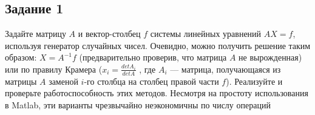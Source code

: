 \documentclass[11pt]{article}
\begin{document}
    \hypertarget{ux437ux430ux434ux430ux43dux438ux435-1}{%
\subsection{Задание 1}\label{ux437ux430ux434ux430ux43dux438ux435-1}}

Задайте матрицу \(A\) и вектор-столбец \(f\) системы линейных уравнений
\(AX = f\), используя генератор случайных чисел. Очевидно, можно
получить решение таким образом: \(X = A^{−1} f\) (предварительно
проверив, что матрица \(A\) не вырожденная) или по правилу Крамера
(\(x_{i} = \frac{det A_{i}}{det A}\) , где \(A_{i}\) --- матрица,
получающаяся из матрицы \(A\) заменой \(i\)-го столбца на столбец правой
части \(f\)). Реализуйте и проверьте работоспособность этих методов.
Несмотря на простоту использования в Matlab, эти варианты чрезвычайно
неэкономичны по числу операций
\end{document}
